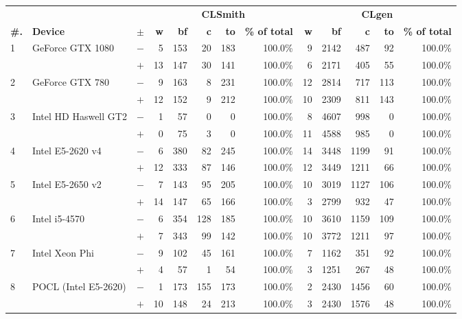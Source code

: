   \begin{tabular}{lll | rrrrr | rrrrr }
  \toprule
  & & & \multicolumn{5}{c|}{\textbf{CLSmith}} & \multicolumn{5}{c}{\textbf{CLgen}} \\
  \textbf{\#.} & \textbf{Device} & $\pm$ &
  \textbf{w} & \textbf{bf} & \textbf{c} & \textbf{to} & \textbf{\% of total} &
  \textbf{w} & \textbf{bf} & \textbf{c} & \textbf{to} & \textbf{\% of total} \\
  \midrule
  \multirow{ 2}{*}{1} & \multirow{ 2}{*}{GeForce GTX 1080} & $-$ & 5 & 153 & 20 & 183 & 100.0\%       & 9 & 2142 & 487 & 92 & 100.0\% \\& & $+$ & 13 & 147 & 30 & 141 & 100.0\% & 6 & 2171 & 405 & 55 & 100.0\% \\
\hline
\multirow{ 2}{*}{2} & \multirow{ 2}{*}{GeForce GTX 780} & $-$ & 9 & 163 & 8 & 231 & 100.0\%       & 12 & 2814 & 717 & 113 & 100.0\% \\& & $+$ & 12 & 152 & 9 & 212 & 100.0\% & 10 & 2309 & 811 & 143 & 100.0\% \\
\hline
\multirow{ 2}{*}{3} & \multirow{ 2}{*}{Intel HD Haswell GT2} & $-$ & 1 & 57 & 0 & 0 & 100.0\%       & 8 & 4607 & 998 & 0 & 100.0\% \\& & $+$ & 0 & 75 & 3 & 0 & 100.0\% & 11 & 4588 & 985 & 0 & 100.0\% \\
\hline
\multirow{ 2}{*}{4} & \multirow{ 2}{*}{Intel E5-2620 v4} & $-$ & 6 & 380 & 82 & 245 & 100.0\%       & 14 & 3448 & 1199 & 91 & 100.0\% \\& & $+$ & 12 & 333 & 87 & 146 & 100.0\% & 12 & 3449 & 1211 & 66 & 100.0\% \\
\hline
\multirow{ 2}{*}{5} & \multirow{ 2}{*}{Intel E5-2650 v2} & $-$ & 7 & 143 & 95 & 205 & 100.0\%       & 10 & 3019 & 1127 & 106 & 100.0\% \\& & $+$ & 14 & 147 & 65 & 166 & 100.0\% & 3 & 2799 & 932 & 47 & 100.0\% \\
\hline
\multirow{ 2}{*}{6} & \multirow{ 2}{*}{Intel i5-4570} & $-$ & 6 & 354 & 128 & 185 & 100.0\%       & 10 & 3610 & 1159 & 109 & 100.0\% \\& & $+$ & 7 & 343 & 99 & 142 & 100.0\% & 10 & 3772 & 1211 & 97 & 100.0\% \\
\hline
\multirow{ 2}{*}{7} & \multirow{ 2}{*}{Intel Xeon Phi} & $-$ & 9 & 102 & 45 & 161 & 100.0\%       & 7 & 1162 & 351 & 92 & 100.0\% \\& & $+$ & 4 & 57 & 1 & 54 & 100.0\% & 3 & 1251 & 267 & 48 & 100.0\% \\
\hline
\multirow{ 2}{*}{8} & \multirow{ 2}{*}{POCL (Intel E5-2620)} & $-$ & 1 & 173 & 155 & 173 & 100.0\%       & 2 & 2430 & 1456 & 60 & 100.0\% \\& & $+$ & 10 & 148 & 24 & 213 & 100.0\% & 3 & 2430 & 1576 & 48 & 100.0\% \\

\end{tabular}
